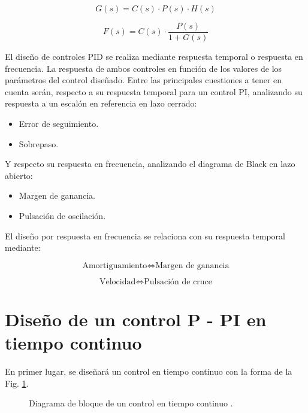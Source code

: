 \documentclass{report}
\begin{document}
\begin{equation}
    G(s) = C(s) \cdot P(s) \cdot H(s)\label{eq.ecuacionG}
\end{equation}


\begin{equation}
    F(s) = C(s) \cdot \frac{P(s)}{1+G(s)} \label{eq.ecuacionF}
\end{equation}

El diseño de controles PID se realiza mediante respuesta temporal o respuesta en frecuencia. La respuesta de ambos controles en función de los valores de los parámetros del control diseñado. Entre las principales cuestiones a tener en cuenta serán, respecto a su respuesta temporal para un control PI, analizando su respuesta a un escalón en referencia en lazo cerrado:

\begin{itemize}
\item Error de seguimiento.
\item Sobrepaso.
\end{itemize}

Y respecto su respuesta en frecuencia, analizando el diagrama de Black en lazo abierto:

\begin{itemize}
    \item Margen de ganancia.
    \item Pulsación de oscilación.
\end{itemize}


El diseño por respuesta en frecuencia se relaciona con su respuesta temporal mediante:

\begin{equation*}   
    \text{Amortiguamiento} \Longleftrightarrow \text{Margen de ganancia}
\end{equation*}

\begin{equation*}
    \text{Velocidad} \Longleftrightarrow \text{Pulsación de cruce}
\end{equation*}

\section{Diseño de un control P - PI en tiempo continuo}\label{sec.controlPIDtiempocontinuo}

En primer lugar, se diseñará un control en tiempo continuo con la forma de la Fig. \ref{fig.diagramacontrolPIDcontinuocite}.

\begin{figure}[!h]
    \begin{center}
        \end{center}
        \caption{Diagrama de bloque de un control en tiempo continuo \cite{treintayseis}.}
        \label{fig.diagramacontrolPIDcontinuocite}
\end{figure}
\end{document}
